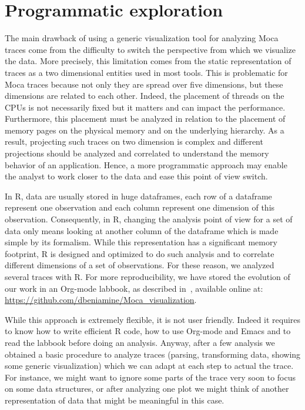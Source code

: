 \section{Programmatic exploration}
\label{sec:visu-second}

The main drawback of using a generic visualization tool for analyzing \gls{Moca} traces come from the difficulty to switch the perspective from which we visualize the data.
More precisely, this limitation comes from the static representation of traces as a two dimensional entities used in most tools.
This is problematic for \gls{Moca} traces because not only they are spread over five dimensions, but these dimensions are related to each other.
Indeed, the placement of threads on the \glspl{CPU} is not necessarily fixed but it matters and can impact the performance.
Furthermore, this placement must be analyzed in relation to the placement of memory pages on the physical memory and on the underlying hierarchy.
As a result, projecting such traces on two dimension is complex and different projections should be analyzed and correlated to understand the memory behavior of an application.
Hence, a more programmatic approach may enable the analyst to work closer to the data and ease this point of view switch.

In \gls{R}, data are usually stored in huge dataframes, each row of a dataframe represent one observation and each column represent one dimension of this observation.
Consequently, in \gls{R}, changing the analysis point of view for a set of data only means looking at another column of the dataframe which is made simple by its formalism.
While this representation has a significant memory footprint, \gls{R} is designed and optimized to do such analysis and to correlate different dimensions of a set of observations.
For these reason, we analyzed several traces with \gls{R}.
For more reproducibility, we have stored the evolution of our work in an \gls{Org-mode} labbook, as described in~\cite[Chapter~4, p~54]{Stanisic15Reproducible}, available online at: \url{https://github.com/dbeniamine/Moca\_visualization}.

While this approach is extremely flexible, it is not user friendly.
Indeed it requires to know how to write efficient \gls{R} code, how to use \gls{Org-mode} and Emacs and to read the labbook before doing an analysis.
Anyway, after a few analysis we obtained a basic procedure to analyze traces (parsing, transforming data, showing some generic visualization) which we can adapt at each step to actual the trace.
For instance, we might want to ignore some parts of the trace very soon to focus on some data structures, or after analyzing one plot we might think of another representation of data that might be meaningful in this case.

